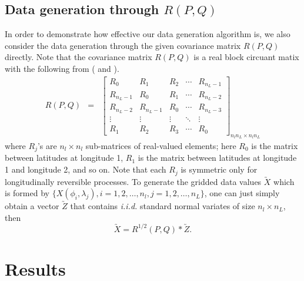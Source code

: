 \subsection{Data generation through $R(P, Q)$}

In order to demonstrate how effective our data generation algorithm is, we also consider the data generation through the given covariance matrix $R(P, Q)$ directly. Note that the covariance matrix $R(P, Q)$ is a real block circuant matix with the following from (\cite{Li2013} and \cite{JunStein2008}). 
 \begin{eqnarray}
	R(P,Q) &=& \left[
		\begin{array}{lllll}
			R_0     & R_1     & R_2    & \cdots & R_{n_L-1} \\
			R_{n_L-1} & R_0     & R_1    & \cdots & R_{n_L-2} \\
			R_{n_L-2} & R_{n_L-1} & R_0    & \cdots & R_{n_L-3} \\
			\vdots  & \vdots  & \vdots & \ddots & \vdots  \\
			R_1     & R_2     & R_3    & \cdots & R_0
		\end{array}
	\right]_{n_ln_L\times n_ln_L}
\end{eqnarray}
\noi where $R_j$'s are $n_l\times n_l$ sub-matrices of real-valued elements; here $R_0$ is the \cov matrix between latitudes at longitude 1, $R_1$ is the \cov matrix between latitudes at longitude 1 and longitude 2, and so on. Note that each $R_j$ is symmetric only for longitudinally reversible processes. To generate the gridded data values $\utilde{X}$ which is formed by $\{X(\phi_i, \lambda_j), i = 1, 2, \ldots, n_l, j = 1, 2, \ldots, n_L\}$, one can just simply obtain a vector $\utilde{Z}$ that contains {\em i.i.d.} standard normal variates of size $n_l \times n_L$, then
\[
\utilde{X} = R^{1/2}(P, Q)*\utilde{Z}.
\] 
 
\vskip 12pt

	\section{Results}
		
	

